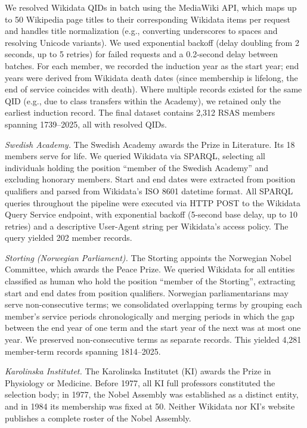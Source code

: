 \documentclass[12pt]{article}
\begin{document}
We resolved Wikidata QIDs in batch using the MediaWiki API, which maps up to 50 Wikipedia page titles to their corresponding Wikidata items per request and handles title normalization (e.g., converting underscores to spaces and resolving Unicode variants). We used exponential backoff (delay doubling from 2 seconds, up to 5 retries) for failed requests and a 0.2-second delay between batches. For each member, we recorded the induction year as the start year; end years were derived from Wikidata death dates (since membership is lifelong, the end of service coincides with death). Where multiple records existed for the same QID (e.g., due to class transfers within the Academy), we retained only the earliest induction record. The final dataset contains 2,312 RSAS members spanning 1739--2025, all with resolved QIDs.

\emph{Swedish Academy.} The Swedish Academy awards the Prize in Literature. Its 18 members serve for life. We queried Wikidata via SPARQL, selecting all individuals holding the position ``member of the Swedish Academy'' and excluding honorary members. Start and end dates were extracted from position qualifiers and parsed from Wikidata's ISO 8601 datetime format. All SPARQL queries throughout the pipeline were executed via HTTP POST to the Wikidata Query Service endpoint, with exponential backoff (5-second base delay, up to 10 retries) and a descriptive User-Agent string per Wikidata's access policy. The query yielded 202 member records.

\emph{Storting (Norwegian Parliament).} The Storting appoints the Norwegian Nobel Committee, which awards the Peace Prize. We queried Wikidata for all entities classified as human who hold the position ``member of the Storting'', extracting start and end dates from position qualifiers. Norwegian parliamentarians may serve non-consecutive terms; we consolidated overlapping terms by grouping each member's service periods chronologically and merging periods in which the gap between the end year of one term and the start year of the next was at most one year. We preserved non-consecutive terms as separate records. This yielded 4,281 member-term records spanning 1814--2025.

\emph{Karolinska Institutet.} The Karolinska Institutet (KI) awards the Prize in Physiology or Medicine. Before 1977, all KI full professors constituted the selection body; in 1977, the Nobel Assembly was established as a distinct entity, and in 1984 its membership was fixed at 50. Neither Wikidata nor KI's website publishes a complete roster of the Nobel Assembly.
\end{document}
